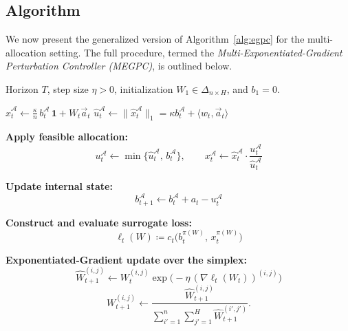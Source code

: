 \subsection{Algorithm}

We now present the generalized version of Algorithm~\ref{alg:egpc} for the multi-allocation setting.  
The full procedure, termed the \emph{Multi-Exponentiated-Gradient Perturbation Controller (MEGPC)}, is outlined below.

\begin{algorithm}
\caption{Multi-Exponentiated-Gradient Perturbation Controller (MEGPC)}
\label{alg:megpc}
\begin{algorithmic}[1]
\Require Horizon \(T\), step size \(\eta > 0\), initialization \(W_1 \in \Delta_{n\times H}\), and \(b_1 = 0\).


    \State 
    \(
        \widehat{x}_t^{\mathcal{A}} 
        \gets
        \frac{\kappa}{n}\, b_t^{\mathcal{A}}\, \mathbf{1}
        +
        W_t \vec{a}_t
    \)
    \State
    \(
        \widehat{u}_t^{\mathcal{A}} 
        \gets
        \|\widehat{x}_t^{\mathcal{A}}\|_1
        =
        \kappa b_t^{\mathcal{A}} + \langle w_t , \vec{a}_t\rangle
    \)

    \State \textbf{Apply feasible allocation:}
    \[
        u_t^{\mathcal{A}} \gets \min\{\widehat{u}_t^{\mathcal{A}},\, b_t^{\mathcal{A}}\},
        \qquad
        x_t^{\mathcal{A}} \gets
        \widehat{x}_t^{\mathcal{A}} \cdot
        \frac{u_t^{\mathcal{A}}}{\widehat{u}_t^{\mathcal{A}}}
    \]

    \State \textbf{Update internal state:}
    \[
        b_{t+1}^{\mathcal{A}} \gets b_t^{\mathcal{A}} + a_t - u_t^{\mathcal{A}}
    \]

    \State \textbf{Construct and evaluate surrogate loss:}
    \[
        \ell_t(W)
        \coloneqq
        c_t\!\bigl(b_t^{\pi(W)},\,x_t^{\pi(W)}\bigr)
    \]

    \State \textbf{Exponentiated-Gradient update over the simplex:}
        \[
            \widehat{W}_{t+1}^{(i,j)} 
            \gets
            W_t^{(i,j)} 
            \exp\!\big(-\eta\, (\nabla \ell_t(W_t))^{(i,j)}\big)
        \]
    \EndFor
    \[
        W_{t+1}^{(i,j)} 
        \gets
        \frac{\widehat{W}_{t+1}^{(i,j)}}
        {\sum_{i'=1}^n \sum_{j'=1}^H \widehat{W}_{t+1}^{(i',j')}}.
    \]
\EndFor
\end{algorithmic}
\end{algorithm}

